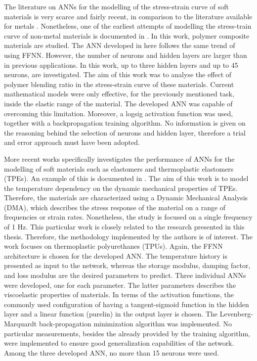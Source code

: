 The literature on ANNs for the modelling of the stress-strain curve of soft materials is very scarce and fairly recent, in comparison to the literature available for metals \cite{ altinkok2005use,setti2014artificial, jenik2017sequential}. Nonetheless, one of the earliest attempts of modelling the stress-train curve of non-metal materials is documented in \cite{yousef2011prediction}. In this work, polymer composite materials are studied. The ANN developed in here follows the same trend of using FFNN. However, the number of neurons and hidden layers are larger than in previous applications. In this work, up to three hidden layers and up to 45 neurons, are investigated. The aim of this work was to analyse the effect of polymer blending ratio in the stress-strain curve of these materials. Current mathematical models were only effective, for the previously mentioned task, inside the elastic range of the material. The developed ANN was capable of overcoming this limitation. Moreover, a logsig activation function was used, together with a backpropagation training algorithm. No information is given on the reasoning behind the selection of neurons and hidden layer, therefore a trial and error approach must have been adopted. 

More recent works specifically investigates the performance of ANNs for the modelling of soft materials such as elastomers and thermoplastic elastomers (TPEs). An example of this is documented in \cite{kopal2017modeling}. The aim of this work is to model the temperature dependency on the dynamic mechanical properties of TPEs. Therefore, the materials are characterized using a Dynamic Mechanical Analysis (DMA), which describes the stress response of the material on a range of frequencies or strain rates. Nonetheless, the study is focused on a single frequency of 1 Hz. This particular work is closely related to the research presented in this thesis. Therefore, the methodology implemented by the authors is of interest. The work focuses on thermoplastic polyurethanes (TPUs). Again, the FFNN architecture is chosen for the developed ANN. The temperature history is presented as input to the network, whereas the storage modulus, damping factor, and loss modulus are the desired parameters to predict. Three individual ANNs were developed, one for each parameter. The latter parameters describes the viscoelastic properties of materials. In terms of the activation functions, the commonly used configuration of having a tangent-sigmoid function in the hidden layer and a linear function (purelin) in the output layer is chosen. The Levenberg-Marquardt back-propagation minimization algorithm was implemented. No particular measurements, besides the already provided by the training algorithm, were implemented to ensure good generalization capabilities of the network. Among the three developed ANN, no more than 15 neurons were used.

